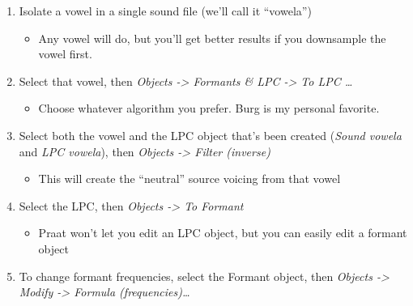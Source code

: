 \begin{enumerate}
\def\labelenumi{\arabic{enumi}.}
\tightlist
\item
  Isolate a vowel in a single sound file (we'll call it ``vowela'')

  \begin{itemize}
  \tightlist
  \item
    Any vowel will do, but you'll get better results if you downsample
    the vowel first.
  \end{itemize}
\item
  Select that vowel, then \emph{Objects -\textgreater{} Formants \& LPC
  -\textgreater{} To LPC \ldots{}}

  \begin{itemize}
  \tightlist
  \item
    Choose whatever algorithm you prefer. Burg is my personal favorite.
  \end{itemize}
\item
  Select both the vowel and the LPC object that's been created
  (\emph{Sound vowela} and \emph{LPC vowela}), then \emph{Objects
  -\textgreater{} Filter (inverse)}

  \begin{itemize}
  \tightlist
  \item
    This will create the ``neutral'' source voicing from that vowel
  \end{itemize}
\item
  Select the LPC, then \emph{Objects -\textgreater{} To Formant}

  \begin{itemize}
  \tightlist
  \item
    Praat won't let you edit an LPC object, but you can easily edit a
    formant object
  \end{itemize}
\item
  To change formant frequencies, select the Formant object, then
  \emph{Objects -\textgreater{} Modify -\textgreater{} Formula
  (frequencies)\ldots{}}
\end{enumerate}

